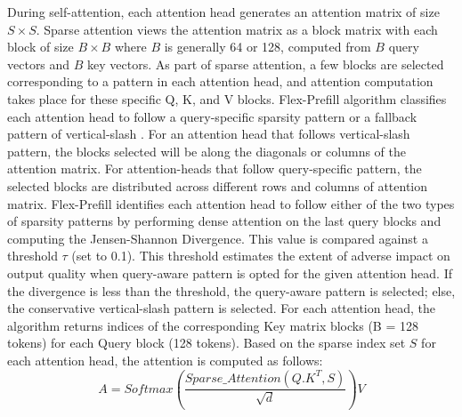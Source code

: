 \documentclass[conference]{IEEEtran}
\begin{document}
\begin{algorithm}
\begin{algorithmic}[1]
 {\color{blue}}
 {\color{blue}}
\end{algorithmic}
\end{algorithm}

During self-attention, each attention head generates an attention matrix of size $S\times S$. Sparse attention views the attention matrix as a block matrix with each block of size $B\times B$ where $B$ is generally 64 or 128, computed from $B$ query vectors and $B$ key vectors. As part of sparse attention, a few blocks are selected corresponding to a pattern in each attention head, and attention computation takes place for these specific Q, K, and V blocks. 
Flex-Prefill algorithm classifies each attention head to follow a query-specific sparsity pattern or a fallback pattern of vertical-slash \cite{NEURIPS2024_5dfbe6f5}. For an attention head that follows vertical-slash pattern, the blocks selected will be along the diagonals or columns of the attention matrix. For attention-heads that follow query-specific pattern, the selected blocks are distributed across different rows and columns of attention matrix. Flex-Prefill identifies each attention head to follow either of the two types of sparsity patterns by performing dense attention on the last query blocks and computing the Jensen-Shannon Divergence. This value is compared against a threshold $\tau$ (set to 0.1). This threshold estimates the extent of adverse impact on output quality when query-aware pattern is opted for the given attention head. If the divergence is less than the threshold, the query-aware pattern is selected; else, the conservative vertical-slash pattern is selected.
For each attention head, the algorithm returns indices of the corresponding Key matrix blocks (B = 128 tokens) for each Query block (128 tokens). Based on the sparse index set $S$ for each attention head, the attention is computed as follows:
\begin{equation}
     A = Softmax(\frac{Sparse\_Attention(Q.K^T, S)}{\sqrt{d}})V
\label{eq_Attn_sparse}
\end{equation}
\end{document}
